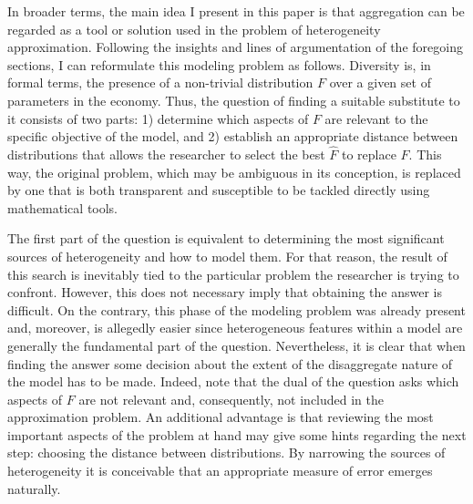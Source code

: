 \documentclass[english, a4paper, 12pt]{article}
\begin{document}
In broader terms, the main idea I present in this paper is that aggregation can be regarded as a tool or solution used in the problem of heterogeneity approximation. Following the insights and lines of argumentation of the foregoing sections, I can reformulate this modeling problem as follows. Diversity is, in formal terms, the presence of a non-trivial distribution $F$ over a given set of parameters in the economy. Thus, the question of finding a suitable substitute to it consists of two parts: 1) determine which aspects of $F$ are relevant to the specific objective of the model, and 2) establish an appropriate distance between distributions that allows the researcher to select the best $\hat{F}$ to replace $F$. This way, the original problem, which may be ambiguous in its conception, is replaced by one that is both transparent and susceptible to be tackled directly using mathematical tools.

The first part of the question is equivalent to determining the most significant sources of heterogeneity and how to model them. For that reason, the result of this search is inevitably tied to the particular problem the researcher is trying to confront. However, this does not necessary imply that obtaining the answer is difficult. On the contrary, this phase of the modeling problem was already present and, moreover, is allegedly easier since heterogeneous features within a model are generally the fundamental part of the question. Nevertheless, it is clear that when finding the answer some decision about the extent of the disaggregate nature of the model has to be made. Indeed, note that the dual of the question asks which aspects of $F$ are not relevant and, consequently, not included in the approximation problem. An additional advantage is that reviewing the most important aspects of the problem at hand may give some hints regarding the next step: choosing the distance between distributions. By narrowing the sources of heterogeneity it is conceivable that an appropriate measure of error emerges naturally.
\end{document}
